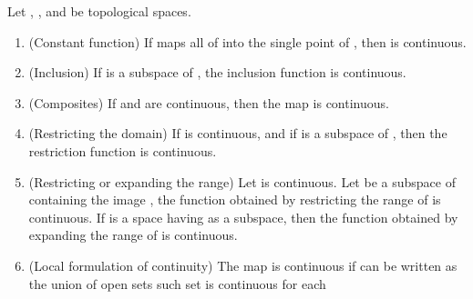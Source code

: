 \begin{theorem}\label{theorem:RulesForConstructingContinuousFunctions}
      Let , , and  be topological spaces.
      \begin{enumerate}
            \item (Constant function) If  maps all of  into the single point  of , then  is continuous.
            \item (Inclusion) If  is a subspace of , the inclusion function  is continuous.
            \item (Composites) If  and  are continuous, then the map  is continuous.
            \item (Restricting the domain) If  is continuous, and if  is a subspace of , then the restriction function  is continuous.
            \item (Restricting or expanding the range) Let  is continuous. Let  be a subspace of  containing the image , the function  obtained by restricting the range of  is continuous. If  is a space having  as a subspace, then the function  obtained by expanding the range of  is continuous.
            \item (Local formulation of continuity) The map  is continuous if  can be written as the union of open sets  such set  is continuous for each \mt{\alpha}
      \end{enumerate}
\end{theorem}

